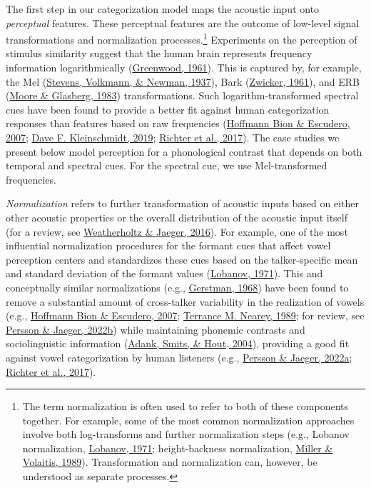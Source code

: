 \documentclass[
  11pt,
  english,
  man,floatsintext]{apa6}
\begin{document}
The first step in our categorization model maps the acoustic input onto \emph{perceptual} features. These perceptual features are the outcome of low-level signal transformations and normalization processes.\footnote{The term normalization is often used to refer to both of these components together. For example, some of the most common normalization approaches involve both log-transforms and further normalization steps (e.g., Lobanov normalization, \protect\hyperlink{ref-lobanov1971}{Lobanov, 1971}; height-backness normalization, \protect\hyperlink{ref-miller1989}{Miller \& Volaitis, 1989}). Transformation and normalization can, however, be understood as separate processes.} Experiments on the perception of stimulus similarity suggest that the human brain represents frequency information logarithmically (\protect\hyperlink{ref-greenwood1961}{Greenwood, 1961}). This is captured by, for example, the Mel (\protect\hyperlink{ref-stevens1937}{Stevens, Volkmann, \& Newman, 1937}), Bark (\protect\hyperlink{ref-zwicker1961}{Zwicker, 1961}), and ERB (\protect\hyperlink{ref-moore-glasberg1983}{Moore \& Glasberg, 1983}) transformations. Such logarithm-transformed spectral cues have been found to provide a better fit against human categorization responses than features based on raw frequencies (\protect\hyperlink{ref-hoffmanbion-escudero2007}{Hoffmann Bion \& Escudero, 2007}; \protect\hyperlink{ref-kleinschmidt2019}{Dave F. Kleinschmidt, 2019}; \protect\hyperlink{ref-richter2017}{Richter et al., 2017}). The case studies we present below model perception for a phonological contrast that depends on both temporal and spectral cues. For the spectral cue, we use Mel-transformed frequencies.

\emph{Normalization} refers to further transformation of acoustic inputs based on either other acoustic properties or the overall distribution of the acoustic input itself (for a review, see \protect\hyperlink{ref-weatherholtz-jaeger2016}{Weatherholtz \& Jaeger, 2016}). For example, one of the most influential normalization procedures for the formant cues that affect vowel perception centers and standardizes these cues based on the talker-specific mean and standard deviation of the formant values (\protect\hyperlink{ref-lobanov1971}{Lobanov, 1971}). This and conceptually similar normalizations (e.g., \protect\hyperlink{ref-gerstman1968}{Gerstman, 1968}) have been found to remove a substantial amount of cross-talker variability in the realization of vowels (e.g., \protect\hyperlink{ref-hoffmanbion-escudero2007}{Hoffmann Bion \& Escudero, 2007}; \protect\hyperlink{ref-nearey1989}{Terrance M. Nearey, 1989}; for review, see \protect\hyperlink{ref-persson-jaeger2023}{Persson \& Jaeger, 2022b}) while maintaining phonemic contrasts and sociolinguistic information (\protect\hyperlink{ref-adank2004}{Adank, Smits, \& Hout, 2004}), providing a good fit against vowel categorization by human listeners (e.g., \protect\hyperlink{ref-persson-jaeger2022}{Persson \& Jaeger, 2022a}; \protect\hyperlink{ref-richter2017}{Richter et al., 2017}).
\end{document}
